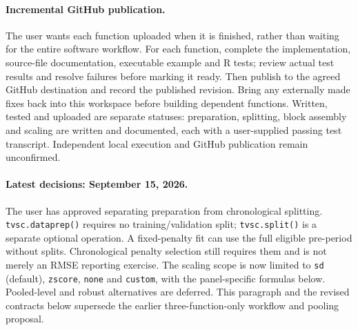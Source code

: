 \documentclass[11pt]{article}
\begin{document}
\paragraph{Incremental GitHub publication.}
The user wants each function uploaded when it is finished, rather than
waiting for the entire software workflow. For each function, complete the
implementation, source-file documentation, executable example and R tests;
review actual test results and resolve failures before marking it ready.
Then publish to the agreed GitHub destination and record the published
revision. Bring any externally made fixes back into this workspace before
building dependent functions. Written, tested and uploaded are separate
statuses: preparation, splitting, block assembly and scaling are written and documented,
each with a user-supplied passing test transcript. Independent local execution
and GitHub publication remain unconfirmed.

\paragraph{Latest decisions: September 15, 2026.}
The user has approved separating preparation from chronological splitting.
\texttt{tvsc.dataprep()} requires no training/validation split;
\texttt{tvsc.split()} is a separate optional operation. A fixed-penalty
fit can use the full eligible pre-period without splits. Chronological
penalty selection still requires them and is not merely an RMSE reporting
exercise. The scaling scope is now limited to \texttt{sd} (default),
\texttt{zscore}, \texttt{none} and \texttt{custom}, with the panel-specific
formulas below. Pooled-level and robust alternatives are deferred.
This paragraph and the revised contracts below supersede the earlier
three-function-only workflow and pooling proposal.
\end{document}
